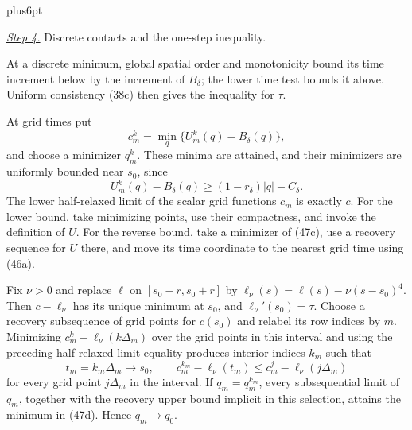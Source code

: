 \documentclass[11pt,reqno]{amsart}
\makeatletter
\theoremstyle{plain}
\theoremstyle{definition}
\theoremstyle{remark}
\renewenvironment{proof}[1][\proofname]{%
  \par
  \pushQED{\qed}%
  \normalfont
  \topsep6pt plus6pt\relax
  \trivlist
  \item[\hskip\labelsep\slshape #1\@addpunct{.}]%
  \ignorespaces
}{%
  \popQED
  \endtrivlist
  \@endpefalse
}
\DeclareRobustCommand{\qed}{%
  \leavevmode\unskip\penalty9999\hbox{}\nobreak
  \ifmmode
    \makebox[0pt][l]{\qquad\hbox{\qedsymbol}}%
  \else
    \qquad\hbox{\qedsymbol}%
  \fi
}
\renewcommand{\qedsymbol}{\rule[.47pt]{4pt}{6pt}}
\numberwithin{equation}{section}
\newcommand{\1}{\mathbf 1}
\makeatother
\begin{document}
\begin{proof}
\smallskip\noindent
\underline{\textit{Step 4.}} Discrete contacts and the one-step inequality.

At a discrete minimum, global spatial order and monotonicity bound
its time increment below by the increment of $B_\delta$; the lower
time test bounds it above.  Uniform consistency (38c) then gives the
inequality for $\tau$.

At grid times put
\begin{equation}
c_ m^k=\min_ q\{U_ m^k(q)-B_ \delta(q)\},
\tag{47g}
\end{equation}
and choose a minimizer $q_ m^k$.  These minima are attained, and their
minimizers are uniformly bounded near $s_ 0$, since
\begin{equation*}
U_ m^k(q)-B_ \delta(q)
\geq(1-r_ \delta)|q|-C_ \delta.
\end{equation*}
The lower half-relaxed limit of the scalar grid functions $c_ m$ is
exactly $c$.  For the lower bound, take minimizing points, use their
compactness, and invoke the definition of $\underline U$.  For the
reverse bound, take a minimizer of (47c), use a recovery sequence for
$\underline U$ there, and move its time coordinate to the nearest
grid time using (46a).

Fix $\nu>0$ and replace $\ell$ on
$[s_ 0-r,s_ 0+r]$ by
$\ell_ \nu(s)=\ell(s)-\nu(s-s_ 0)^4$.  Then
$c-\ell_ \nu$ has its unique minimum at $s_ 0$, and
$\ell_ \nu'(s_ 0)=\tau$.  Choose a recovery subsequence of grid
points for $c(s_0)$ and relabel its row indices by $m$.  Minimizing
$c_ m^k-\ell_ \nu(k\Delta_ m)$ over the grid points in this interval
and using the preceding half-relaxed-limit equality produces interior
indices $k_ m$ such that
\begin{equation}
t_ m=k_ m\Delta_ m\longrightarrow s_ 0,\qquad
c_ m^{k_ m}-\ell_ \nu(t_ m)
\leq c_ m^j-\ell_ \nu(j\Delta_ m)
\tag{47h}
\end{equation}
for every grid point $j\Delta_ m$ in the interval.  If
$q_ m=q_ m^{k_ m}$, every subsequential limit of $q_ m$, together with
the recovery upper bound implicit in this selection, attains the
minimum in (47d).  Hence $q_ m\to q_ 0$.


\end{proof}
\end{document}
